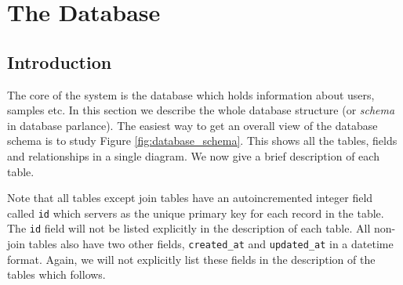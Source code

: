 \documentclass[12pt,twoside]{article}
\begin{document}
\section{The Database}\label{sec:database}
\subsection{Introduction}
The core of the system is the database which holds information about 
users, samples etc. In this section we describe the whole database
structure (or \emph{schema} in database parlance).
The easiest way to get an overall view of the database schema is to
study Figure \ref{fig:database_schema}. This shows
all the tables, fields and relationships in a single diagram.
We now give a brief description of each table.

Note that all tables except join tables have an autoincremented integer field
called \verb=id= which servers as the unique primary key for each record
in the table. The \verb=id= field will not be listed explicitly in the
description of each table. All non-join tables also have two other
fields, \verb=created_at= and \verb=updated_at= in a datetime format.
Again, we will not explicitly list these fields in the description
of the tables which follows.
\end{document}
